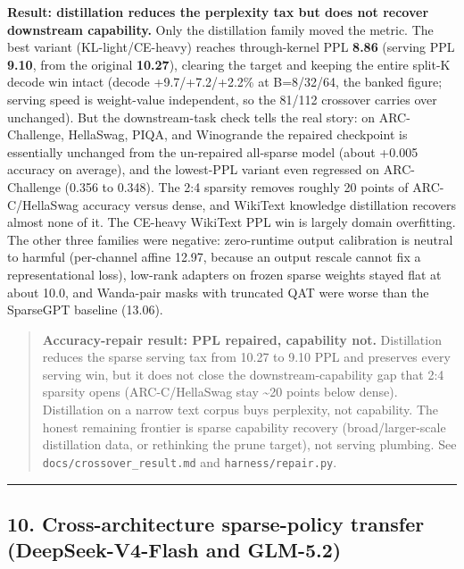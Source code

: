 \documentclass[
]{article}
\begin{document}
\textbf{Result: distillation reduces the perplexity tax but does not
recover downstream capability.} Only the distillation family moved the
metric. The best variant (KL-light/CE-heavy) reaches through-kernel PPL
\textbf{8.86} (serving PPL \textbf{9.10}, from the original
\textbf{10.27}), clearing the target and keeping the entire split-K
decode win intact (decode +9.7/+7.2/+2.2\% at B=8/32/64, the banked
figure; serving speed is weight-value independent, so the 81/112
crossover carries over unchanged). But the downstream-task check tells
the real story: on ARC-Challenge, HellaSwag, PIQA, and Winogrande the
repaired checkpoint is essentially unchanged from the un-repaired
all-sparse model (about +0.005 accuracy on average), and the lowest-PPL
variant even regressed on ARC-Challenge (0.356 to 0.348). The 2:4
sparsity removes roughly 20 points of ARC-C/HellaSwag accuracy versus
dense, and WikiText knowledge distillation recovers almost none of it.
The CE-heavy WikiText PPL win is largely domain overfitting. The other
three families were negative: zero-runtime output calibration is neutral
to harmful (per-channel affine 12.97, because an output rescale cannot
fix a representational loss), low-rank adapters on frozen sparse weights
stayed flat at about 10.0, and Wanda-pair masks with truncated QAT were
worse than the SparseGPT baseline (13.06).

\begin{quote}
\textbf{Accuracy-repair result: PPL repaired, capability not.}
Distillation reduces the sparse serving tax from 10.27 to 9.10 PPL and
preserves every serving win, but it does not close the
downstream-capability gap that 2:4 sparsity opens (ARC-C/HellaSwag stay
\textasciitilde20 points below dense). Distillation on a narrow text
corpus buys perplexity, not capability. The honest remaining frontier is
sparse capability recovery (broad/larger-scale distillation data, or
rethinking the prune target), not serving plumbing. See
\texttt{docs/crossover\_result.md} and \texttt{harness/repair.py}.
\end{quote}

\begin{center}\rule{0.5\linewidth}{0.5pt}\end{center}

\subsection{10. Cross-architecture sparse-policy transfer
(DeepSeek-V4-Flash and
GLM-5.2)}\label{cross-architecture-sparse-policy-transfer-deepseek-v4-flash-and-glm-5.2}
\end{document}
